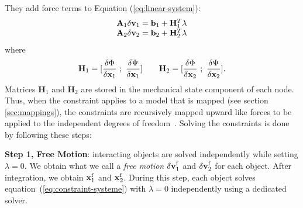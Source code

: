 They add force terms to Equation (\ref{eq:linear-system}):
\begin{equation}
\begin{array}{c}
\mathbf{A}_1  \mathbf{\delta\mathbf{v } }_1 = \mathbf{b}_1 + \mathbf{H}_1^T \lambda\\
\mathbf{A}_2  \mathbf{\delta\mathbf{v } }_2 = \mathbf{b}_2 + \mathbf{H}_2^T \lambda
\label{eq:constraint-systeme}
\end{array}
\end{equation}
where 
\begin{equation}
\mathbf{H}_1 = [\frac{\delta \Phi}{\delta \mathbf{x }_1} \  ; \  \frac{\delta \Psi}{\delta \mathbf{x }_1}  ]\qquad  \mathbf{H}_2 = [\frac{\delta \Phi}{\delta \mathbf{x }_2} \  ; \  \frac{\delta \Psi}{\delta \mathbf{x }_2}  ].
\end{equation}
Matrices $\mathbf{H}_1$ and $\mathbf{H}_2$ are stored in the mechanical state component of each node. Thus, when the constraint applies to a model that is mapped (see section \ref{sec:mappings}), the constraints are recursively mapped upward like forces to be applied to the independent degrees of freedom~\cite{Duriez_eurographics2008}. 
Solving the constraints is done by following these steps:


\textbf{Step 1, Free Motion}: interacting objects are solved independently while setting $ \lambda  = 0$. 
We obtain what we call a \textit{free motion} $\mathbf{\delta\mathbf{v } }_1^{\mathrm{f}}$  and  $\mathbf{\delta\mathbf{v } }_2^{\mathrm{f}}$ for each object. After integration, we obtain $\mathbf{x }_{1}^{\mathrm{f}}$ and $\mathbf{x }_{2}^{\mathrm{f}}$. 
During this step, each object solves equation~(\ref{eq:constraint-systeme}) with $ \lambda  = 0$ independently using a dedicated solver.  

\vspace{2mm}

